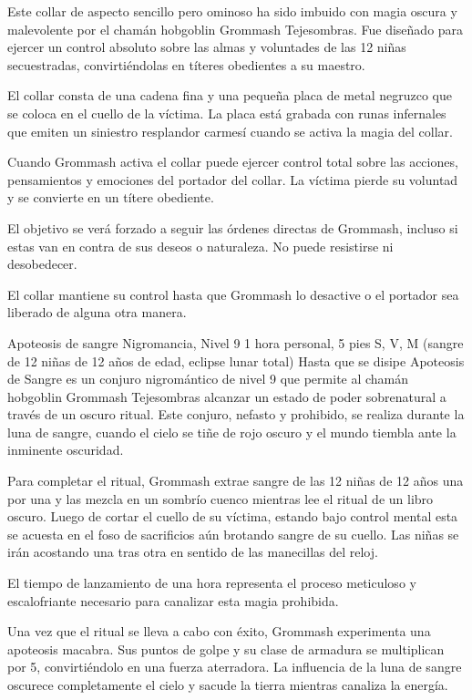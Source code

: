 \documentclass[10pt,twoside,twocolumn,openany]{dndbook}
\begin{document}
Este collar de aspecto sencillo pero ominoso ha sido imbuido con magia oscura y malevolente por el 
chamán hobgoblin Grommash Tejesombras. Fue diseñado para ejercer un control absoluto sobre las 
almas y voluntades de las 12 niñas secuestradas, convirtiéndolas en títeres obedientes a su 
maestro.

El collar consta de una cadena fina y una pequeña placa de metal negruzco que se coloca en el 
cuello de la víctima. La placa está grabada con runas infernales que emiten un siniestro 
resplandor carmesí cuando se activa la magia del collar.

Cuando Grommash activa el collar puede ejercer control total sobre las acciones, pensamientos 
y emociones del portador del collar. La víctima pierde su voluntad y se convierte en un títere 
obediente.

El objetivo se verá forzado a seguir las órdenes directas de Grommash, incluso si estas van en 
contra de sus deseos o naturaleza. No puede resistirse ni desobedecer.

El collar mantiene su control hasta que Grommash lo desactive o el portador sea liberado de alguna 
otra manera.

\DndSpellHeader%
{Apoteosis de sangre}
{Nigromancia, Nivel 9}
{1 hora}
{personal, 5 pies}
{S, V, M (sangre de 12 niñas de 12 años de edad, eclipse lunar total)}
{Hasta que se disipe}
Apoteosis de Sangre es un conjuro nigromántico de nivel 9 que permite al chamán hobgoblin 
Grommash Tejesombras alcanzar un estado de poder sobrenatural a través de un oscuro ritual. Este 
conjuro, nefasto y prohibido, se realiza durante la luna de sangre, cuando el cielo se tiñe de 
rojo oscuro y el mundo tiembla ante la inminente oscuridad.

Para completar el ritual, Grommash extrae sangre de las 12 niñas de 12 años una por una y las 
mezcla en un sombrío cuenco mientras lee el ritual de un libro oscuro. Luego de cortar el cuello 
de su víctima, estando bajo control mental esta se acuesta en el foso de sacrificios aún brotando 
sangre de su cuello. Las niñas se irán acostando una tras otra en sentido de las manecillas del 
reloj.

El tiempo de lanzamiento de una hora representa el proceso meticuloso y escalofriante necesario 
para canalizar esta magia prohibida.

Una vez que el ritual se lleva a cabo con éxito, Grommash experimenta una apoteosis macabra. Sus 
puntos de golpe y su clase de armadura se multiplican por 5, convirtiéndolo en una fuerza 
aterradora. La influencia de la luna de sangre oscurece completamente el cielo y sacude la tierra 
mientras canaliza la energía.
\end{document}
